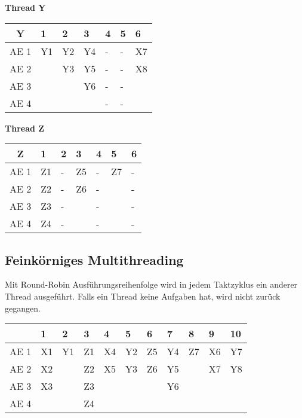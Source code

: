 \documentclass
[
	8pt,		%
	ngerman,	%
	a4paper,	%
	landscape,	%
	final		%
]{extarticle}
\begin{document}
\begin{multicols*}{4}
\textbf{Thread Y}\par\vspace{\abovedisplayskip}
\begin{tabularx}{\linewidth}{|c|XXXXXX|}\hline
	Y    & 1  & 2  & 3  & 4 & 5 & 6  \\\hline
	AE 1 & Y1 & Y2 & Y4 & - & - & X7 \\
	AE 2 &    & Y3 & Y5 & - & - & X8 \\
	AE 3 &    &    & Y6 & - & - &    \\
	AE 4 &    &    &    & - & - &    \\\hline
\end{tabularx}\par\vspace{\belowdisplayskip}

\textbf{Thread Z}\par\vspace{\abovedisplayskip}
\begin{tabularx}{\linewidth}{|c|XXXXXX|}\hline
	Z    & 1  & 2 & 3  & 4 & 5  & 6 \\\hline
	AE 1 & Z1 & - & Z5 & - & Z7 & - \\
	AE 2 & Z2 & - & Z6 & - &    & - \\
	AE 3 & Z3 & - &    & - &    & - \\
	AE 4 & Z4 & - &    & - &    & - \\\hline
\end{tabularx}\par\vspace{\belowdisplayskip}
\subsection{Feinkörniges Multithreading}
Mit Round-Robin Ausführungsreihenfolge wird in jedem Taktzyklus ein anderer
Thread ausgeführt. Falls ein Thread keine Aufgaben hat, wird nicht zurück
gegangen. \par
\begingroup\setlength\tabcolsep{2pt}
\small
\vspace{\abovedisplayskip}
\begin{tabularx}{\linewidth}{|c|XXXXXXXXXX|}\hline
	     & 1  & 2  & 3  & 4  & 5  & 6  & 7  & 8  & 9  & 10 \\\hline
	AE 1 & X1 & Y1 & Z1 & X4 & Y2 & Z5 & Y4 & Z7 & X6 & Y7 \\
	AE 2 & X2 &    & Z2 & X5 & Y3 & Z6 & Y5 &    & X7 & Y8 \\
	AE 3 & X3 &    & Z3 &    &    &    & Y6 &    &    &    \\
	AE 4 &    &    & Z4 &    &    &    &    &    &    &    \\\hline
\end{tabularx}
\endgroup

\end{multicols*}
\end{document}
